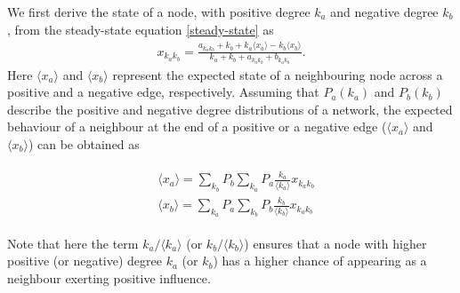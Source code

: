 We first derive the state of a node, with positive degree $k_{a}$ and negative degree $k_{b}$, from the steady-state equation \cref{steady-state} as
\begin{align}
    x_{k_{a}k_{b}} = \frac{a_{k_{a}k_{b}} + k_{b} + k_{a} \langle x_{a} \rangle - k_{b} \langle x_{b} \rangle}{k_{a} + k_{b} + a_{k_{a}k_{b}} + b_{k_{a}k_{b}}}.
    \label{ss}
\end{align}
Here $\langle x_{a} \rangle$ and $\langle x_{b} \rangle$ represent the expected state of a neighbouring node across a positive and a negative edge, respectively. 
Assuming that $P_{a} (k_{a})$  and $P_{b} (k_{b})$ describe the positive and negative degree distributions of a network, the expected behaviour of a neighbour at the end of a positive or a negative edge ($\langle x_{a} \rangle$ and $\langle x_{b} \rangle$) can be obtained as

\begin{align}
\begin{aligned}
     & \langle x_{a} \rangle = \sum_{k_{b}} P_{b} \sum_{k_{a}} P_{a} \frac{k_a}{\langle k_{a} \rangle} x_{k_{a}k_{b}} \\ 
     & \langle x_{b} \rangle = \sum_{k_{a}} P_{a} \sum_{k_{b}} P_{b} \frac{k_b}{\langle k_{b} \rangle} x_{k_{a}k_{b}}
\end{aligned}
\label{nbr}
\end{align}


Note that here the term $k_{a}/\langle k_{a} \rangle$ (or $k_{b}/\langle k_{b} \rangle$) ensures that a node with higher positive (or negative) degree $k_{a}$ (or $k_{b}$) has a higher chance of appearing as a neighbour exerting positive influence.


